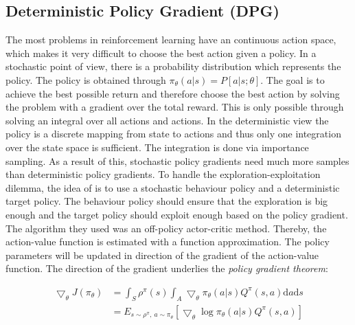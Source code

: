 \subsection{Deterministic Policy Gradient (DPG)}
\label{sec:DPG}
\nocite{lillicrap2015continuous}
The most problems in reinforcement learning have an continuous action space, 
which makes it very difficult to choose the best action given a policy. In a 
stochastic point of view, there is a probability distribution which represents 
the policy. The policy is obtained through $\pi_\theta(a|s) =P[a|s;\theta]$. 
The goal is to achieve the best possible return and therefore choose the best 
action by solving the problem with a gradient over the total reward. This is 
only possible through solving an integral over all actions and actions. In the 
deterministic view the policy is a discrete mapping from state to actions and 
thus only one integration over the state space is sufficient. The integration 
is done via importance sampling. As a result of 
this, stochastic policy gradients need much more samples than deterministic 
policy gradients. To handle the exploration-exploitation dilemma, the idea of 
\citeauthor{silver2014deterministic} is to use a stochastic behaviour policy  
and a deterministic target policy. The behaviour policy should ensure that the 
exploration is big enough and the target policy should exploit enough based on 
the policy gradient. The algorithm they used was an off-policy actor-critic 
method. Thereby, the action-value function is estimated with a function 
approximation. The policy parameters will be updated in direction of the 
gradient of the action-value function. The direction of the gradient underlies 
the \textit{policy gradient theorem}: 

\begin{align*}
\bigtriangledown_\theta 
J(\pi_\theta)&=\int_{S}^{}\rho^\pi(s)\int_{A}\bigtriangledown_\theta 
\pi_\theta(a|s)Q^\pi(s,a)\mathrm{d}a\mathrm{d}s\\
 &=E_{s \sim \rho^\pi,\: a\sim\pi_\theta}[\bigtriangledown_\theta \log 
 \pi_\theta (a|s)Q^\pi(s,a)]
\end{align*}%

